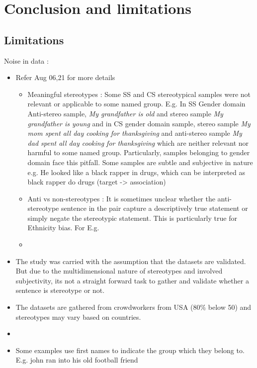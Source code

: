 \chapter{Conclusion and limitations}

\section{Limitations}
Noise in data :
\begin{itemize}
    \item Refer \cite{blodgett2021stereotyping} Aug 06,21 for more details 
    \begin{itemize}
        \item Meaningful stereotypes : Some SS and CS stereotypical samples  were not relevant or applicable to some named group. E.g. In SS   Gender domain Anti-stereo sample, \textit{ My grandfather is old} and stereo sample \textit{My grandfather is young} and in CS gender domain sample, stereo sample \textit{My mom spent all day cooking for thanksgiving} and anti-stereo sample \textit{My dad spent all day cooking for thanksgiving} which are neither relevant nor harmful to some named group. Particularly, samples belonging to gender domain face this pitfall. Some samples are subtle and subjective in nature e.g. He looked like a black rapper in drugs, which can be interpreted as black rapper do drugs (target -> association)
        \item Anti vs non-stereotypes : It is sometimes unclear whether the anti-stereotype sentence in the pair capture a descriptively true statement or simply negate the stereotypic statement. This is particularly true for Ethnicity bias. For E.g. 
        \item 
    \end{itemize}
    \item The study was carried with the assumption that the datasets are validated. But due to the multidimensional nature of stereotypes and involved subjectivity, its not a straight forward task to gather and validate whether a sentence is stereotype or not.  
    \item The datasets are gathered from crowdworkers from USA (80\% below 50) and stereotypes may vary based on countries. 
    \item 
    \item Some examples use first names to indicate the group which they belong to.
    E.g. john ran into his old football friend
\end{itemize}